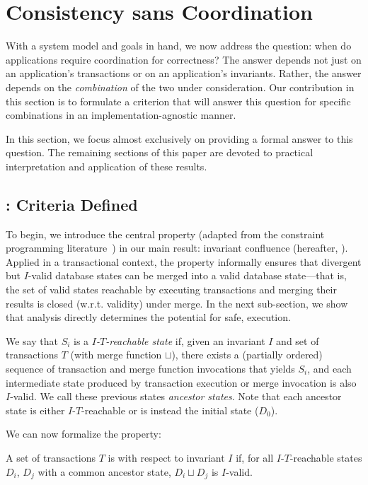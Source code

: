 
\section{Consistency sans Coordination}
\label{sec:bcc-theory}

With a system model and goals in hand, we now address the question:
when do applications require coordination for correctness? The answer
depends not just on an application's transactions or on an 
application's invariants. Rather, the answer depends on the
\textit{combination} of the two under consideration. Our contribution
in this section is to formulate a criterion that will answer this
question for specific combinations in an implementation-agnostic
manner.

In this section, we focus almost exclusively on providing a formal
answer to this question. The remaining sections of this paper are
devoted to practical interpretation and application of these results.

\subsection{\iconfluence: Criteria Defined}

To begin, we introduce the central property (adapted from the constraint
programming literature~\cite{obs-confluence}) in our main
result: invariant confluence (hereafter, \iconfluence). Applied in a
transactional context, the \iconfluence property informally ensures
that divergent but $I$-valid database states can be merged into a
valid database state---that is, the set of valid states reachable by
executing transactions and merging their results is closed
(w.r.t. validity) under merge. In the next sub-section, we show that
\iconfluence analysis directly determines the potential for safe,
\cfree execution.

We say that $S_i$ is a \textit{$I$-$T$-reachable state} if, given an
invariant $I$ and set of transactions $T$ (with merge function
$\sqcup$), there exists a (partially ordered) sequence of transaction
and merge function invocations that yields $S_i$, and each
intermediate state produced by transaction execution or merge
invocation is also $I$-valid. We call these previous states
\textit{ancestor states}. Note that each ancestor state is either
$I$-$T$-reachable or is instead the initial state ($D_0$).

We can now formalize the \iconfluence property:

\begin{definition}[\iconfluence]
  A set of transactions $T$ is \iconfluent with respect to invariant
  $I$ if, for all $I$-$T$-reachable states $D_i$, $D_j$ with a common
  ancestor state, $D_i \sqcup D_j$ is $I$-valid.
\end{definition}

